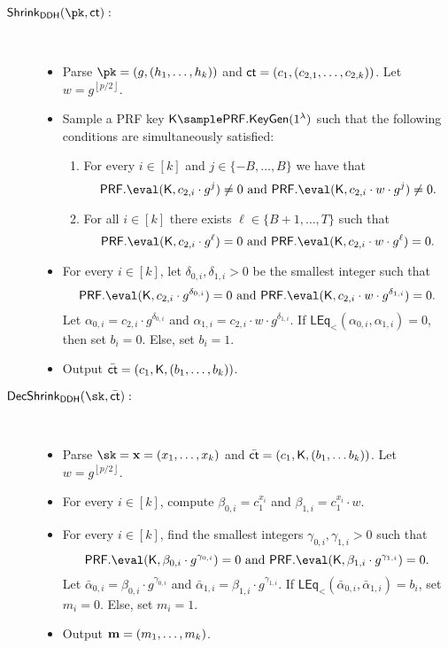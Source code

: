 \begin{description}
\item[$\mathsf{Shrink}_\mathsf{DDH}(\pk,\ct):$]~ 
\begin{itemize}
    \item Parse $\pk=(g,(h_1,\dots, h_k))$ and $\mathsf{ct}=(c_1,(c_{2,1},\dots, c_{2,k}))$. Let $w=g^{\left \lfloor p/2\right\rfloor}$.
    \item Sample a PRF key $\key\sample \PRF.\keygen(1^\lambda)$ such that the following conditions are simultaneously satisfied:
    \begin{enumerate}
        \item\label{Cond:bound} For every $i\in[k]$ and $j\in\{-B,\dots,B\}$ we have that $$\PRF.\eval(\key,c_{2,i}\cdot g^j)\neq 0 \text{ and } \PRF.\eval(\key,c_{2,i}\cdot w\cdot g^j)\neq 0.$$
        \item\label{Cond:breakpoint} For all $i\in[k]$ there exists $\ell \in \{B+1,\dots,T\}$ such that $$\PRF.\eval(\key, c_{2,i}\cdot g^\ell)=0\text{ and }\PRF.\eval(\key,c_{2,i}\cdot w \cdot g^\ell)= 0.$$
    \end{enumerate}
    \item For every $i\in[k]$, let $\delta_{0,i},\delta_{1,i}>0$ be the smallest integer such that $$\PRF.\eval(\key,c_{2,i}\cdot g^{\delta_{0,i}})=0 \text{ and }\PRF.\eval(\key,c_{2,i}\cdot w\cdot g^{\delta_{1,i}})=0.$$ Let $\alpha_{0,i}=c_{2,i}\cdot g^{\delta_{0,i}}$ and $\alpha_{1,i}=c_{2,i}\cdot w\cdot g^{\delta_{1,i}}$. If $\mathsf{LEq}_<(\alpha_{0,i},\alpha_{1,i})=0$, then set $b_i=0$. Else, set  $b_i=1$.
    \item Output $\bar {\mathsf{ct}}=(c_1,\mathsf{K},(b_1,\dots, b_k))$.
\end{itemize}


\item[$\mathsf{DecShrink}_\mathsf{DDH}(\sk,\bar \ct):$]~
\begin{itemize}
    \item Parse $\sk=\xn=(x_1,\dots,x_k)$ and $\bar {\mathsf{ct}}=(c_1,\mathsf{K},(b_1,\dots b_k))$. Let $w=g^{\left \lfloor p/2\right\rfloor}$.
    \item For every $i\in [k]$, compute $\beta_{0,i}=c_1^{x_i}$ and $\beta_{1,i}=c_1^{x_i}\cdot w$.
    \item For every $i\in [k]$, find the smallest integers $\gamma_{0,i},\gamma_{1,i}>0$ such that $$\PRF.\eval(\key,\beta_{0,i}\cdot g^{\gamma_{0,i}})=0 \text{ and }\PRF.\eval(\key,\beta_{1,i}\cdot g^{\gamma_{1,i}})=0.$$ Let $\bar \alpha_{0,i}=\beta_{0,i}\cdot g^{\gamma_{0,i}}$ and $\bar \alpha_{1,i}=\beta_{1,i}\cdot g^{\gamma_{1,i}}$. If $\mathsf{LEq}_<(\bar\alpha_{0,i},\bar \alpha_{1,i})=b_i$, set $m_i=0$. Else, set $m_i=1$.
    \item Output $\mathbf{m}=(m_1,\dots, m_k)$.
\end{itemize}
\end{description}




